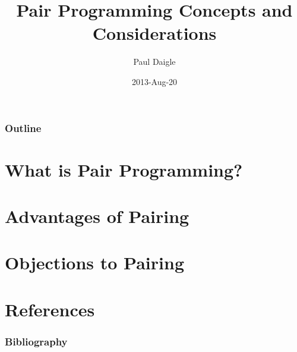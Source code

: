 

\title[] %
{Pair Programming Concepts and Considerations}

\subtitle
{} %

\author[] %
{Paul Daigle }



\date[] %
{2013-Aug-20}

\subject{}














\begin{frame}
  \titlepage
\end{frame}

\begin{frame}
  \frametitle{Outline}
  \tableofcontents
\end{frame}


\section{What is Pair Programming?}

\section{Advantages of Pairing}

\section{Objections to Pairing}

\section{References}
\begin{frame}[allowframebreaks]
  \frametitle{Bibliography}
  
\end{frame}



